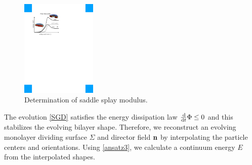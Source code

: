 \begin{figure}
\centerline{\includegraphics[width=0.32\textwidth]{Figures/SaddleSplayDiagram.pdf}}
\caption{
\label{fig:saddle_splay}  
Determination of saddle splay modulus.
}
\end{figure}
%
The evolution \eqref{SGD} satisfies the energy dissipation law $\frac{\dif }{\dif t} \Phi \leq 0$
and this stabilizes the evolving bilayer shape.
Therefore, we reconstruct an evolving monolayer dividing surface $\Sigma$ and director field ${\bf n}$ by
interpolating the particle centers and orientations. Using \eqref{ansatz3}, we calculate a continuum energy $E$ from the interpolated shapes.


%
%

